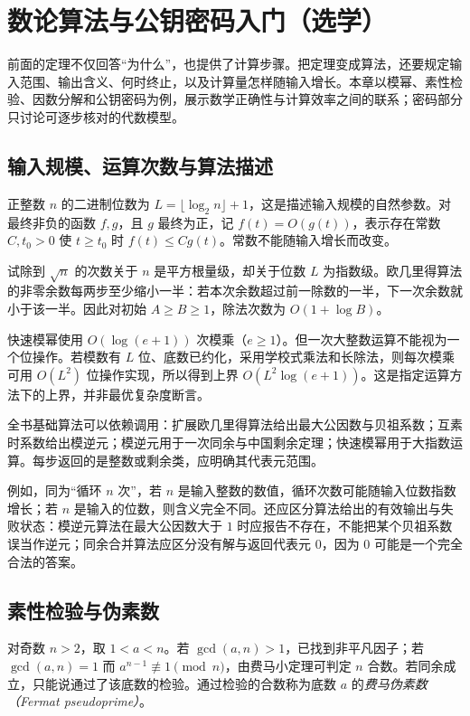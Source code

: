 \setcounter{chapter}{13} %
\chapter{数论算法与公钥密码入门（选学）}
\label{ch:algorithms}

前面的定理不仅回答“为什么”，也提供了计算步骤。把定理变成算法，还要规定输入范围、输出含义、何时终止，以及计算量怎样随输入增长。本章以模幂、素性检验、因数分解和公钥密码为例，展示数学正确性与计算效率之间的联系；密码部分只讨论可逐步核对的代数模型。

\section{输入规模、运算次数与算法描述}

正整数 $n$ 的二进制位数为 $L=\lfloor\log_2n\rfloor+1$，这是描述输入规模的自然参数。对最终非负的函数 $f,g$，且 $g$ 最终为正，记 $f(t)=O(g(t))$，表示存在常数 $C,t_0>0$ 使 $t\ge t_0$ 时 $f(t)\le Cg(t)$。常数不能随输入增长而改变。

试除到 $\sqrt n$ 的次数关于 $n$ 是平方根量级，却关于位数 $L$ 为指数级。欧几里得算法的非零余数每两步至少缩小一半：若本次余数超过前一除数的一半，下一次余数就小于该一半。因此对初始 $A\ge B\ge1$，除法次数为 $O(1+\log B)$。

快速模幂使用 $O(\log(e+1))$ 次模乘（$e\ge1$）。但一次大整数运算不能视为一个位操作。若模数有 $L$ 位、底数已约化，采用学校式乘法和长除法，则每次模乘可用 $O(L^2)$ 位操作实现，所以得到上界 $O(L^2\log(e+1))$。这是指定运算方法下的上界，并非最优复杂度断言。

全书基础算法可以依赖调用：扩展欧几里得算法给出最大公因数与贝祖系数；互素时系数给出模逆元；模逆元用于一次同余与中国剩余定理；快速模幂用于大指数运算。每步返回的是整数或剩余类，应明确其代表元范围。

例如，同为“循环 $n$ 次”，若 $n$ 是输入整数的数值，循环次数可能随输入位数指数增长；若 $n$ 是输入的位数，则含义完全不同。还应区分算法给出的有效输出与失败状态：模逆元算法在最大公因数大于 $1$ 时应报告不存在，不能把某个贝祖系数误当作逆元；同余合并算法应区分没有解与返回代表元 $0$，因为 $0$ 可能是一个完全合法的答案。

\section{素性检验与伪素数}

对奇数 $n>2$，取 $1<a<n$。若 $\gcd(a,n)>1$，已找到非平凡因子；若 $\gcd(a,n)=1$ 而 $a^{n-1}\not\equiv1\pmod n$，由费马小定理可判定 $n$ 合数。若同余成立，只能说通过了该底数的检验。通过检验的合数称为底数 $a$ 的\emph{费马伪素数（Fermat pseudoprime）}。

